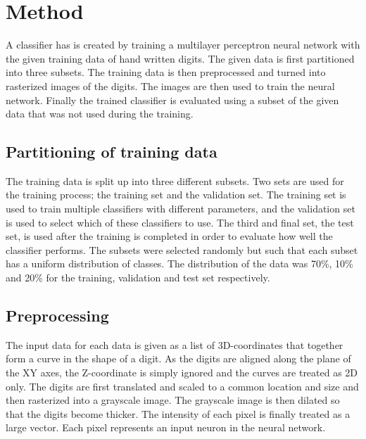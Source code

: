\documentclass[report.tex]{subfile}
\begin{document}
\section{Method}
A classifier has is created by training a multilayer perceptron neural network
with the given training data of hand written digits. The given data is first
partitioned into three subsets. The training data is then preprocessed and
turned into rasterized images of the digits. The images are then used to train
the neural network. Finally the trained classifier is evaluated using a subset
of the given data that was not used during the training.

\subsection{Partitioning of training data}
The training data is split up into three different subsets. Two sets are used
for the training process; the training set and the validation set. The training
set is used to train multiple classifiers with different parameters, and the
validation set is used to select which of these classifiers to use. The third
and final set, the test set, is used after the training is completed in order
to evaluate how well the classifier performs. The subsets were selected
randomly but such that each subset has a uniform distribution of classes. The
distribution of the data was 70\%, 10\% and 20\% for the training, validation
and test set respectively.

\subsection{Preprocessing}
The input data for each data is given as a list of 3D-coordinates that together
form a curve in the shape of a digit. As the digits are aligned along the plane
of the XY axes, the Z-coordinate is simply ignored and the curves are treated
as 2D only. The digits are first translated and scaled to a common location and
size and then rasterized into a grayscale image. The grayscale image is then
dilated so that the digits become thicker. The intensity of each pixel is
finally treated as a large vector. Each pixel represents an input neuron in the
neural network.
\end{document}
